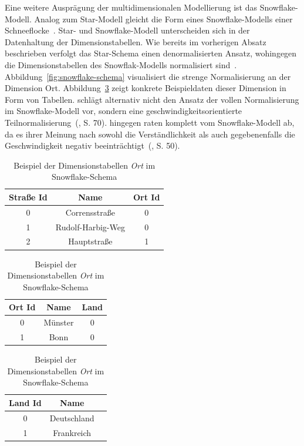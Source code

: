 \documentclass[
  language=german, %
  type=bachelor%
]{isthesis}
\begin{document}
\begin{content}
  Eine weitere Ausprägung der multidimensionalen Modellierung ist das Snowflake-Modell.
  Analog zum Star-Modell gleicht die Form eines Snowflake-Modells einer
  Schneeflocke~\cite[][S. 70]{Kemper2010}. Star- und Snowflake-Modell
  unterscheiden sich in der Datenhaltung der Dimensionstabellen. Wie bereits im
  vorherigen Absatz beschrieben verfolgt das Star-Schema einen denormalisierten
  Ansatz, wohingegen die Dimensionstabellen des Snowflak-Modells normalisiert
  sind~\cite[][S. 70]{Kemper2010}. Abbildung~\ref{fig:snowflake-schema}
  visualisiert die strenge Normalisierung an der Dimension Ort.
  Abbildung~\ref{table:dimension-table-snow} zeigt konkrete Beispieldaten dieser
  Dimension in Form von Tabellen.  \textsc{\citeauthor{Kemper2010}} schlägt alternativ
  nicht den Ansatz der vollen Normalisierung im Snowflake-Modell vor, sondern eine
  geschwindigkeitsorientierte Teilnormalisierung~(\citeyear{Kemper2010}, S. 70).
  \textsc{\citeauthor{Kimball2013}} hingegen raten komplett vom Snowflake-Modell
  ab, da es ihrer Meinung nach sowohl die Verständlichkeit als auch gegebenenfalls die
  Geschwindigkeit negativ beeinträchtigt~(\citeyear{Kimball2013}, S. 50).

  \begin{figure}[caption={Teilausschnitt eines Snowflake-Schemas}, label={fig:snowflake-schema}]
    \resizebox{250pt}{!}{}
  \end{figure}

  \begin{table}
    \footnotesize
    \begin{tabular}{c c c }
      Straße Id & Name & Ort Id \\
      \toprule
      0 & Corrensstraße & 0 \\
      1 & Rudolf-Harbig-Weg & 0 \\
      2 & Hauptstraße & 1 \\
    \end{tabular}
    \begin{tabular}{c c c}
      Ort Id & Name & Land \\
      \toprule
      0 & Münster & 0 \\
      1 & Bonn & 0 \\
    \end{tabular}
    \begin{tabular}{c c c }
      Land Id & Name \\
      \toprule
      0 & Deutschland \\
      1 & Frankreich \\
    \end{tabular}
    \caption{Beispiel der Dimensionstabellen \textit{Ort} im Snowflake-Schema}\label{table:dimension-table-snow}
  \end{table}


\end{content}
\end{document}
